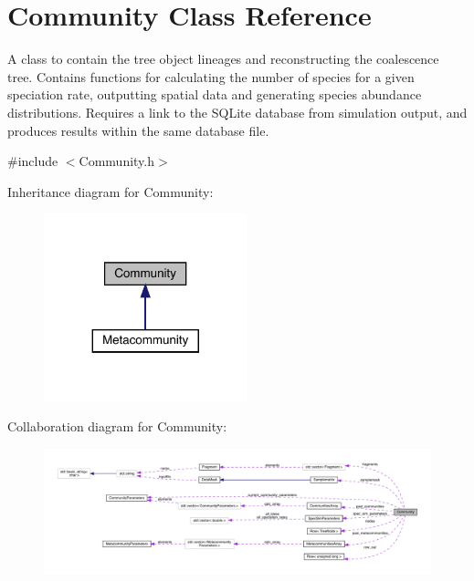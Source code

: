 \hypertarget{class_community}{}\section{Community Class Reference}
\label{class_community}


A class to contain the tree object lineages and reconstructing the coalescence tree. Contains functions for calculating the number of species for a given speciation rate, outputting spatial data and generating species abundance distributions. Requires a link to the S\+Q\+Lite database from simulation output, and produces results within the same database file.  




{\ttfamily \#include $<$Community.\+h$>$}



Inheritance diagram for Community\+:\nopagebreak
\begin{figure}[H]
\begin{center}
\leavevmode
\includegraphics[width=167pt]{class_community__inherit__graph}
\end{center}
\end{figure}


Collaboration diagram for Community\+:
\nopagebreak
\begin{figure}[H]
\begin{center}
\leavevmode
\includegraphics[width=350pt]{class_community__coll__graph}
\end{center}
\end{figure}
